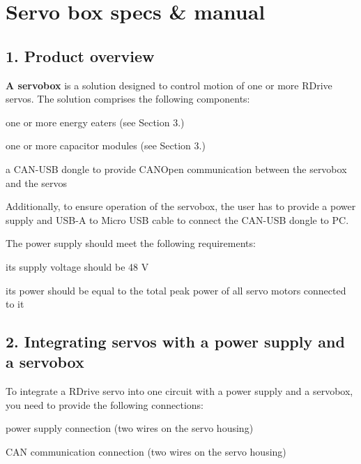 \hypertarget{group__hw__manual}{}\section{Servo box specs \& manual}
\label{group__hw__manual}
\hypertarget{group__hw__manual_sect_descr}{}\subsection{1. Product overview}\label{group__hw__manual_sect_descr}
{\bfseries A servobox} is a solution designed to control motion of one or more R\+Drive servos. The solution comprises the following components\+:
\begin{DoxyItemize}
\item one or more energy eaters (see Section 3.)
\item one or more capacitor modules (see Section 3.)
\item a C\+A\+N-\/\+U\+SB dongle to provide C\+A\+N\+Open communication between the servobox and the servos
\end{DoxyItemize}

Additionally, to ensure operation of the servobox, the user has to provide a power supply and U\+S\+B-\/A to Micro U\+SB cable to connect the C\+A\+N-\/\+U\+SB dongle to PC.

The power supply should meet the following requirements\+:
\begin{DoxyItemize}
\item its supply voltage should be 48 V
\item its power should be equal to the total peak power of all servo motors connected to it
\end{DoxyItemize}\hypertarget{group__hw__manual_sect_conn}{}\subsection{2. Integrating servos with a power supply and a servobox}\label{group__hw__manual_sect_conn}
To integrate a R\+Drive servo into one circuit with a power supply and a servobox, you need to provide the following connections\+:


\begin{DoxyItemize}
\item power supply connection (two wires on the servo housing)
\item C\+AN communication connection (two wires on the servo housing)
\end{DoxyItemize}

